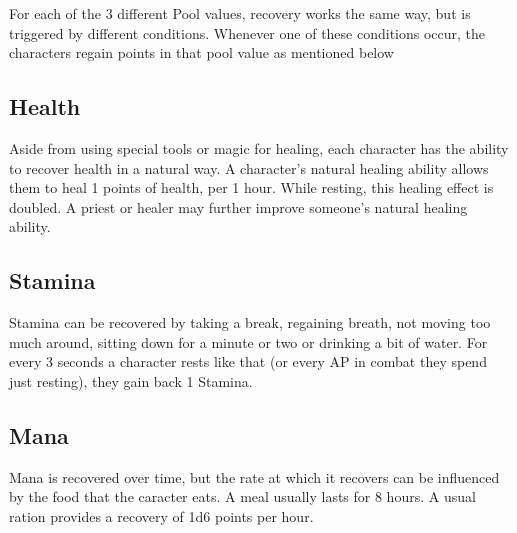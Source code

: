For each of the 3 different Pool values, recovery works the same way, but is triggered by different conditions. Whenever one of these conditions occur, the characters regain points in that pool value as mentioned below


\subsection{Health}

Aside from using special tools or magic for healing, each character has the ability to recover health in a natural way. A character's natural healing ability allows them to heal 1 points of health, per 1 hour. While resting, this healing effect is doubled.
A priest or healer may further improve someone's natural healing ability.


\subsection{Stamina}

Stamina can be recovered by taking a break, regaining breath, not moving too much around, sitting down for a minute or two or drinking a bit of water. For every 3 seconds a character rests like that (or every AP in combat they spend just resting), they gain back 1 Stamina.


\subsection{Mana}

Mana is recovered over time, but the rate at which it recovers can be influenced by the food that the caracter eats. A meal usually lasts for 8 hours. A usual ration provides a recovery of 1d6 points per hour.